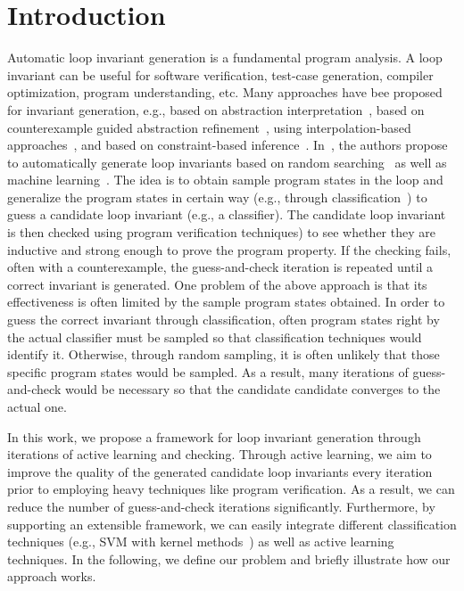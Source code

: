 
\section{Introduction} %
\label{sec:introduction}
Automatic loop invariant generation is a fundamental program analysis. A loop invariant can be useful for software verification, test-case generation, compiler optimization, program understanding, etc.
Many approaches have bee proposed for invariant generation, e.g., based on abstraction interpretation~\cite{cite}, based on counterexample guided abstraction refinement~\cite{cite}, using interpolation-based approaches~\cite{cite}, and based on constraint-based inference~\cite{cite}. In~\cite{sharma2012interpolants,DBLP:conf/sas/0001GHAN13,sharma2014invariant}, the authors propose to automatically generate loop invariants based on random searching~\cite{sharma2014invariant} as well as machine learning~\cite{sharma2012interpolants}. The idea is to obtain sample program states in the loop and generalize the program states in certain way (e.g., through classification~\cite{sharma2012interpolants,DBLP:conf/sas/0001GHAN13}) to guess a candidate loop invariant (e.g., a classifier). The candidate loop invariant is then checked using program verification techniques) to see whether they are inductive and strong enough to prove the program property. If the checking fails, often with a counterexample, the guess-and-check iteration is repeated until a correct invariant is generated. One problem of the above approach is that its effectiveness is often limited by the sample program states obtained. In order to guess the correct invariant through classification, often program states right by the actual classifier must be sampled so that classification techniques would identify it. Otherwise, through random sampling, it is often unlikely that those specific program states would be sampled. As a result, many iterations of guess-and-check would be necessary so that the candidate candidate converges to the actual one.

In this work, we propose a framework for loop invariant generation through iterations of active learning and checking. Through active learning, we aim to improve the quality of the generated candidate loop invariants every iteration prior to employing heavy techniques like program verification. As a result, we can reduce the number of guess-and-check iterations significantly. Furthermore, by supporting an extensible framework, we can easily integrate different classification techniques (e.g., SVM with kernel methods~\cite{}) as well as active learning techniques. %
In the following, we define our problem and briefly illustrate how our approach works.

